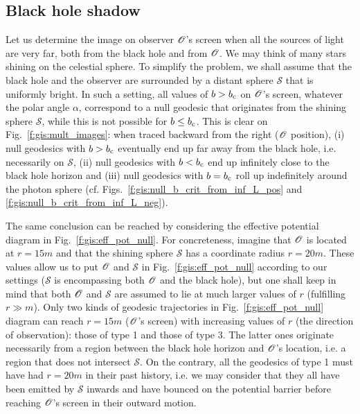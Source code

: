\subsection{Black hole shadow} \label{s:gis:shadow}

Let us determine the image on observer $\mathscr{O}$'s screen
when all the sources of light are very far, both
from the black hole and from $\mathscr{O}$. We may think of many stars
shining on the celestial sphere. To simplify the problem, we shall assume
that the black hole and the observer are surrounded by a distant
sphere $\mathscr{S}$ that is uniformly bright. In such a setting,
all values of $b > b_{\rm c}$ on $\mathscr{O}$'s screen, whatever the polar angle $\alpha$,
correspond to a null geodesic that originates from the shining sphere $\mathscr{S}$, while
this is not possible for $b \leq b_{\rm c}$.
This is clear on Fig.~\ref{f:gis:mult_images}: when traced backward from the right
($\mathscr{O}$ position), (i) null geodesics with $b > b_{\rm c}$ eventually end
up far away from the black hole, i.e. necessarily on $\mathscr{S}$, (ii) null geodesics
with $b < b_{\rm c}$ end up infinitely close to the black hole horizon
and (iii) null geodesics with $b = b_{\rm c}$ roll up indefinitely around
the photon sphere (cf. Figs.~\ref{f:gis:null_b_crit_from_inf_L_pos} and
\ref{f:gis:null_b_crit_from_inf_L_neg}).

The same conclusion can be reached
by considering the effective potential diagram in Fig.~\ref{f:gis:eff_pot_null}.
For concreteness, imagine that $\mathscr{O}$ is located at $r=15 m$ and that
the shining sphere $\mathscr{S}$ has a coordinate radius $r=20 m$.
These values allow us to put $\mathscr{O}$ and $\mathscr{S}$
in Fig.~\ref{f:gis:eff_pot_null} according
to our settings ($\mathscr{S}$ is encompassing both $\mathscr{O}$ and the black
hole), but one shall keep in mind that both $\mathscr{O}$ and $\mathscr{S}$
are assumed to lie at much larger values of $r$ (fulfilling $r\gg m$).
Only two kinds of geodesic
trajectories in Fig.~\ref{f:gis:eff_pot_null} diagram can reach $r = 15m$ ($\mathscr{O}$'s screen) with increasing values
of $r$ (the direction of observation): those of type 1 and those of type 3.
The latter ones originate necessarily from a region between the black hole
horizon and $\mathscr{O}$'s location, i.e. a region that does not intersect $\mathscr{S}$.
On the contrary, all the geodesics of type 1 must have had $r = 20 m$
in their past history, i.e. we may consider that they all have been emitted
by $\mathscr{S}$ inwards and have bounced on the potential barrier before
reaching $\mathscr{O}$'s screen in their outward motion.


